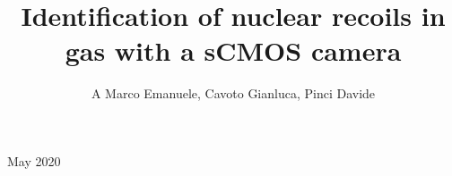 \documentclass[12pt]{iopart}
\begin{document}
\title[]{Identification of  nuclear recoils in gas  with a sCMOS camera}

\newcommand {\ie}{\mbox{i.e.}\xspace}     %
\newcommand {\eg}{\mbox{e.g.}\xspace}     %

\newcommand{\fe}{\ensuremath{^{55}\textrm{Fe}}\xspace}
\newcommand{\abs}[1]{\ensuremath{\vert #1 \vert}}
\newcommand{\ambe}{\ensuremath{\textrm{Am} \textrm{Be}}\xspace}
\newcommand{\isclu}{\ensuremath{I_{SC}}\xspace}
\newcommand{\tsigmag}{\ensuremath{\sigma^T_{Gauss}}\xspace}
\newcommand{\dedl}{\ensuremath{\frac{dE}{dl_p}}\xspace}

\newcommand{\lemon}{{\textsc{Lemon}}\xspace}
\newcommand{\idbscan}{{\textsc{iDbscan}}\xspace}
\newcommand{\dbscan}{{\textsc{Dbscan}}\xspace}
\newcommand{\gac}{{\textsc{Gac}}\xspace}
\newcommand{\nnc}{{\textsc{Nnc}}\xspace}
\newcommand{\GEANTfour} {{\textsc{Geant4}}\xspace}
\newcommand{\SRIM} {{\textsc{Srim}}\xspace}
\newcommand{\garfield} {{\textsc{Garfield}}\xspace}

\newcommand{\unit}[1]{\ensuremath{\textrm{\,#1}}\xspace}
\newcommand{\keV}{\ensuremath{\,\textrm{ke\hspace{-.08em}V}}\xspace}
\newcommand{\MeV}{\ensuremath{\,\textrm{Me\hspace{-.08em}V}}\xspace}

\author{A Marco Emanuele, Cavoto Gianluca, Pinci Davide}

\address{San Miguel, Mexico}
\vspace{10pt}
\begin{indented}
\item[]May 2020
\end{indented}

\begin{abstract}

\end{abstract}

%
%
%
% 
%
\end{document}
